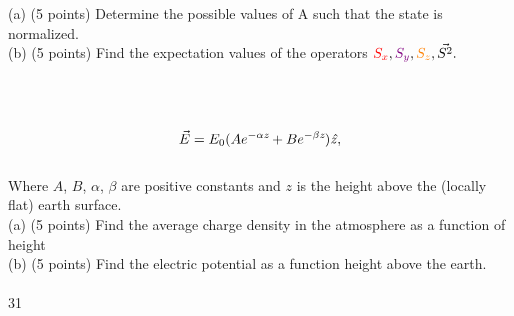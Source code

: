 \documentclass[12pt]{article}
\begin{document}
(a) (5 points) Determine the possible values of A such that the state is normalized.\\


(b) (5 points) Find the expectation values of the operators ${\color{red}S_x}, {\color{violet}S_y}, {\color{orange}S_z}, \Vec{S^2}.$ \\

 \\

 \\


 \\

\begin{equation}
    \large{\Vec{E}=E_0(Ae^{-\alpha\textit{z}}+Be^{-\beta\textit{z}})\hat{\mathit{z,}}}
\end{equation} \\

Where $A$, $B$, $\alpha$, $\beta$ are positive constants and $\textit{z}$ is the height above the (locally flat) earth surface.\\


(a) (5 points) Find the average charge density in the atmosphere as a function of height \\

(b) (5 points) Find the electric potential as a function height above the earth. \\
\vspace{20pt} \\
 \hspace{5.4in} 31
\end{document}
